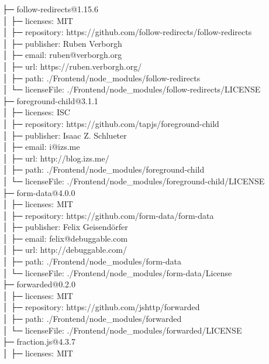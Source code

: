 \documentclass[
    paper=a4,
    twoside=false,
    parskip=half,
    listof=entryprefix,
    listof=totoc,
    index=totoc,
    bibliography=totoc,
    headsepline,
]{scrbook}
\begin{document}
    ├─ follow-redirects@1.15.6\\
    │  ├─ licenses: MIT\\
    │  ├─ repository: https://github.com/follow-redirects/follow-redirects\\
    │  ├─ publisher: Ruben Verborgh\\
    │  ├─ email: ruben@verborgh.org\\
    │  ├─ url: https://ruben.verborgh.org/\\
    │  ├─ path: ./Frontend/node\_modules/follow-redirects\\
    │  └─ licenseFile: ./Frontend/node\_modules/follow-redirects/LICENSE\\
    ├─ foreground-child@3.1.1\\
    │  ├─ licenses: ISC\\
    │  ├─ repository: https://github.com/tapjs/foreground-child\\
    │  ├─ publisher: Isaac Z. Schlueter\\
    │  ├─ email: i@izs.me\\
    │  ├─ url: http://blog.izs.me/\\
    │  ├─ path: ./Frontend/node\_modules/foreground-child\\
    │  └─ licenseFile: ./Frontend/node\_modules/foreground-child/LICENSE\\
    ├─ form-data@4.0.0\\
    │  ├─ licenses: MIT\\
    │  ├─ repository: https://github.com/form-data/form-data\\
    │  ├─ publisher: Felix Geisendörfer\\
    │  ├─ email: felix@debuggable.com\\
    │  ├─ url: http://debuggable.com/\\
    │  ├─ path: ./Frontend/node\_modules/form-data\\
    │  └─ licenseFile: ./Frontend/node\_modules/form-data/License\\
    ├─ forwarded@0.2.0\\
    │  ├─ licenses: MIT\\
    │  ├─ repository: https://github.com/jshttp/forwarded\\
    │  ├─ path: ./Frontend/node\_modules/forwarded\\
    │  └─ licenseFile: ./Frontend/node\_modules/forwarded/LICENSE\\
    ├─ fraction.js@4.3.7\\
    │  ├─ licenses: MIT\\
\end{document}
